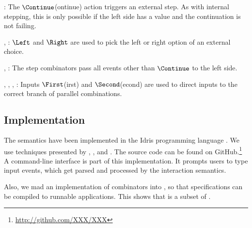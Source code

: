 :
The $\Continue$(ontinue) action triggers an external step.
As with internal stepping, this is only possible if the left side has a value and the continuation is not failing.

,
:
$\Left$ and $\Right$ are used to pick the left or right option of an external choice.

,
:
The step combinators pass all events other than $\Continue$ to the left side.

,
,
,
:
Inputs $\First$(irst) and $\Second$(econd) are used to direct inputs to the correct branch of parallel combinations.



\subsection{Implementation}

The semantics have been implemented in the Idris programming language \cite{journals/jfp/Brady13}.
We use techniques presented by \textcite{journals/entcs/JaskelioffGH11}, \textcite{journals/jfp/Swierstra08}, and \textcite{school/maktoberdorf/PeytonJones01}.
The source code can be found on GitHub.\footnote{\url{http://github.com/XXX/XXX}}
A command-line interface is part of this implementation.
It prompts users to type input events, which get parsed and processed by the interaction semantics.

Also, we mad an implementation of \TOPHAT combinators into \ITASKS,
so that \TOPHAT specifications can be compiled to runnable applications.
This shows that \TOPHAT is a subset of \ITASKS.
